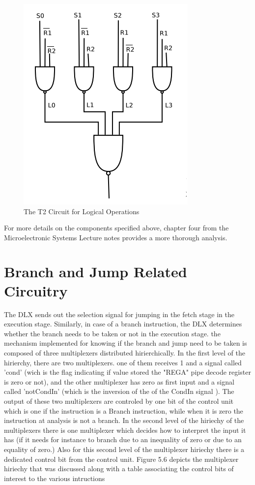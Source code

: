     \begin{figure}[h!]
        \centering
        \includegraphics[scale = .6]
        {chapters/figures/T2Logic}
        \caption{The T2 Circuit for Logical Operations}
        \label{fig:T2Logic}
        \end{figure}

    For more details on the components specified above, chapter four from the Microelectronic Systems Lecture notes provides a more thorough analysis.
\newpage

\section{ Branch and Jump Related Circuitry }

The DLX sends out the selection signal for jumping in the fetch stage in the execution stage. Similarly, in case of a branch instruction,
the DLX determines whether the branch needs to be taken or not in the execution stage. the mechanism implemented for knowing if the branch and
jump need to be taken is composed of three multiplexers distributed hirierchically. In the first level of the hirierchy, there are two multiplexers.
one of them receives 1 and a signal called 'cond' (wich is the flag indicating if value stored the "REGA" pipe decode register is zero or not), and the other multiplexer has zero as first input 
and a signal called 'notCondIn' (which is the inversion of the of the CondIn signal ). The output of these two multiplexers are controled by one bit of the 
control unit which is one if the instruction is a Branch instruction, while when it is zero the instruction at analysis is not a branch. 
In the  second level of the hiriechy of the multiplexers there is one multiplexer which decides how to interpret the input it has (if it needs for instance
to branch due to an inequality of zero or due to an equality of zero.) Also for this second level of the multiplexer hiriechy there is a dedicated control bit from the  control unit.
Figure 5.6 depicts the multiplexer hiriechy that was discussed along with a table associating the control bits of interest to the various intructions


